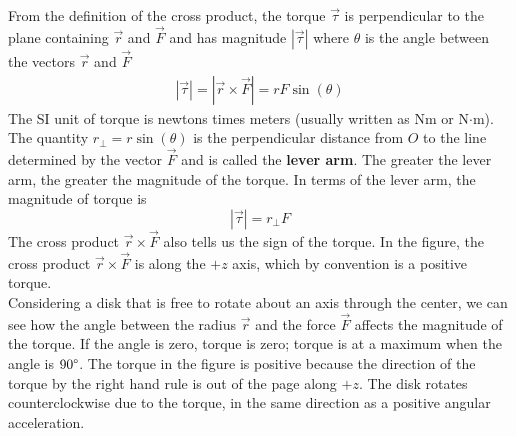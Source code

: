 \documentclass[a4paper]{article}
\let\bf\textbf
\def\centerarc[#1](#2)(#3:#4:#5){\draw[#1] ($(#2)+({#5*cos(#3)},{#5*sin(#3)})$) arc (#3:#4:#5)}
\begin{document}
From the definition of the cross product, the torque $\vec{\tau}$ is perpendicular to the plane containing $\vec{r}$ and $\vec{F}$ and has magnitude $|\vec{\tau}|$ where $\theta$ is the angle between the vectors $\vec{r}$ and $\vec{F}$
\begin{align*}
    |\vec{\tau}| = |\vec{r} \times \vec{F}| = rF\sin(\theta)
\end{align*}
The SI unit of torque is newtons times meters (usually written as Nm or N$\cdot$m). The quantity $r_{\perp} = r\sin(\theta)$ is the perpendicular distance from $O$ to the line determined by the vector $\vec{F}$ and is called the \bf{lever arm}. The greater the lever arm, the greater the magnitude of the torque. In terms of the lever arm, the magnitude of torque is 
\begin{equation}
    |\vec{\tau}| = r_{\perp}F
\end{equation}
The cross product $\vec{r} \times \vec{F}$ also tells us the sign of the torque. In the figure, the cross product $\vec{r} \times \vec{F}$ is along the $+z$ axis, which by convention is a positive torque. 
\vspace{1mm}\\
Considering a disk that is free to rotate about an axis through the center, we can see how the angle between the radius $\vec{r}$ and the force $\vec{F}$ affects the magnitude of the torque. If the angle is zero, torque is zero; torque is at a maximum when the angle is $90\degree$. The torque in the figure is positive because the direction of the torque by the right hand rule is out of the page along $+z$. The disk rotates counterclockwise due to the torque, in the same direction as a positive angular acceleration.
\begin{center}
\end{center}
\end{document}
